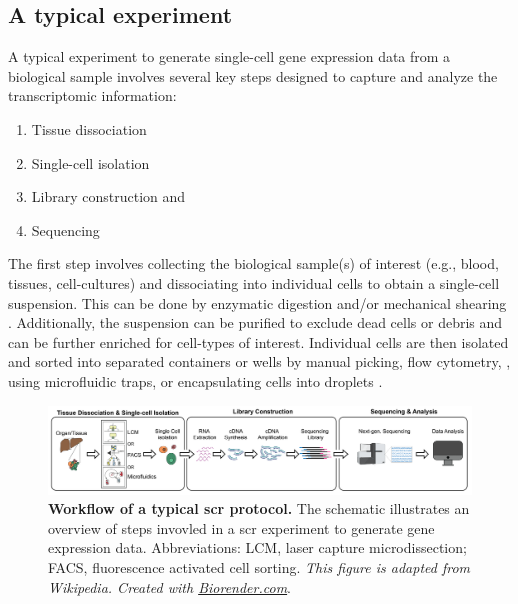 \subsection{A typical  experiment}
\label{sec:scrna_typical}
\par A typical experiment to generate single-cell gene expression data from a biological sample involves several key steps designed to capture and analyze the transcriptomic information: 
\begin{enumerate}
\item Tissue dissociation
\item Single-cell isolation
\item Library construction and 
\item Sequencing 
\end{enumerate}

The first step involves collecting the biological sample(s) of interest (e.g., blood, tissues, cell-cultures) and dissociating into individual cells to obtain a single-cell suspension. This can be done by enzymatic digestion and/or mechanical shearing \textbf{\cite{vieira_braga_tissue_2019}}. Additionally, the suspension can be purified to exclude dead cells or debris and can be further enriched for cell-types of interest. Individual cells are then isolated and sorted into separated containers or wells by manual picking, \textbf{\cite{tang_mrna-seq_2009,kalisky_brief_2018,guo_resolution_2010}}
flow cytometry, \textbf{\cite{hayashi_single-cell_2010,jaitin_massively_2014}}, 
using microfluidic traps, \textbf{\cite{kalisky_brief_2018,treutlein_reconstructing_2014,streets_microfluidic_2014}} 
or encapsulating cells into droplets \textbf{\cite{kalisky_brief_2018,klein_droplet_2015,macosko_highly_2015}}. 

\begin{figure}[H]
    \centering
    \includegraphics[width=\linewidth]{Chapter1/Fig/F1-5-01.png}
    \caption[A typical single-cell RNA-sequencing experiment]{\textbf{Workflow of a typical \gls{scr} protocol.} The schematic illustrates an overview of steps invovled in a \gls{scr} experiment to generate gene expression data. Abbreviations: LCM, laser capture microdissection; FACS, fluorescence activated cell sorting. \textit{This figure is adapted from Wikipedia. Created with \href{https://www.biorender.com/}{Biorender.com}}.}
    \label{fig:chp1_scrna-2}
\end{figure}

